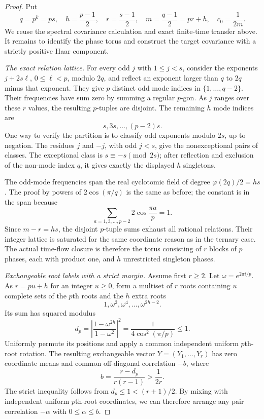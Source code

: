 \documentclass[11pt,a4paper]{article}
\theoremstyle{definition}\newtheorem{definition}[theorem]{Definition}
\theoremstyle{remark}\newtheorem{remark}[theorem]{Remark}
\begin{document}
\begin{proof}
Put
\[
 q=p^k=ps,\quad h=\frac{p-1}{2},\quad
 r=\frac{s-1}{2},\quad m=\frac{q-1}{2}=pr+h,
 \quad c_0=\frac1{2m}.
\]
We reuse the spectral covariance calculation and exact finite-time
transfer above. It remains to identify the phase torus and construct
the target covariance with a strictly positive Haar component.

\emph{The exact relation lattice.}
For every odd $j$ with $1\le j<s$, consider the exponents
$j+2s\ell$, $0\le\ell<p$, modulo $2q$, and reflect an exponent
larger than $q$ to $2q$ minus that exponent. They give $p$ distinct
odd mode indices in $\{1,\ldots,q-2\}$. Their frequencies have
sum zero by summing a regular $p$-gon. As $j$ ranges over these
$r$ values, the resulting $p$-tuples are disjoint. The remaining
$h$ mode indices are
\[
 s,3s,\ldots,(p-2)s.
\]
One way to verify the partition is to classify odd exponents modulo
$2s$, up to negation. The residues $j$ and $-j$, with odd $j<s$,
give the nonexceptional pairs of classes. The exceptional class is
$s\equiv-s\pmod{2s}$; after reflection and exclusion of the
non-mode index $q$, it gives exactly the displayed $h$ singletons.

The odd-mode frequencies span the real cyclotomic field of degree
\(\varphi(2q)/2=h s\). The proof by powers of
$2\cos(\pi/q)$ is the same as before; the constant is in the span
because
\[
 \sum_{a=1,3,\ldots,p-2}2\cos\frac{\pi a}{p}=1.
\]
Since $m-r=hs$, the disjoint $p$-tuple sums exhaust all rational
relations. Their integer lattice is saturated for the same coordinate
reason as in the ternary case. The actual time-flow closure is
therefore the torus consisting of $r$ blocks of $p$ phases, each
with product one, and $h$ unrestricted singleton phases.

\emph{Exchangeable root labels with a strict margin.}
Assume first $r\ge2$. Let $\omega=e^{2\pi i/p}$.
As $r=pu+h$ for an integer $u\ge0$, form a multiset of $r$ roots
containing $u$ complete sets of the $p$th roots and the $h$ extra
roots
\[
 1,\omega^2,\omega^4,\ldots,\omega^{2h-2}.
\]
Its sum has squared modulus
\[
 d_p=\left|\frac{1-\omega^{2h}}{1-\omega^2}\right|^2
     =\frac1{4\cos^2(\pi/p)}\le1.
\]
Uniformly permute its positions and apply a common independent
uniform $p$th-root rotation. The resulting exchangeable vector
$Y=(Y_1,\ldots,Y_r)$ has zero coordinate means and common
off-diagonal correlation $-b$, where
\[
 b=\frac{r-d_p}{r(r-1)}>\frac1{2r}.
\]
The strict inequality follows from $d_p\le1<(r+1)/2$.
By mixing with independent uniform $p$th-root coordinates, we can
therefore arrange any pair correlation $-\alpha$ with $0\le\alpha\le b$.


\end{proof}
\end{document}
